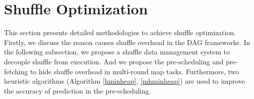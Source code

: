 \section{Shuffle Optimization}
\label{opt}
This section presents detailed methodologies to achieve shuffle optimization. 
{\color{blue}
Firstly, we discuss the reason causes shuffle overhead in the DAG frameworks.
In the following subsection, we propose a shuffle data management system to decouple shuffle from execution. 
And we propose the pre-scheduling and pre-fetching to hide shuffle overhead in multi-round map tasks.
Furthermore, two heuristic algorithms (Algorithm \ref{hminheap}, \ref{mhminheap}) are used to improve the accuracy of prediction in the pre-scheduling.
}



